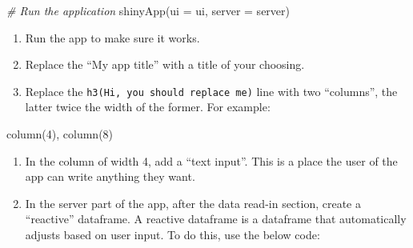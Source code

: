\documentclass[
]{book}
\newenvironment{Shaded}{\begin{snugshade}}{\end{snugshade}}
\newcommand{\AttributeTok}[1]{\textcolor[rgb]{0.77,0.63,0.00}{#1}}
\newcommand{\CommentTok}[1]{\textcolor[rgb]{0.56,0.35,0.01}{\textit{#1}}}
\newcommand{\DecValTok}[1]{\textcolor[rgb]{0.00,0.00,0.81}{#1}}
\newcommand{\FunctionTok}[1]{\textcolor[rgb]{0.00,0.00,0.00}{#1}}
\newcommand{\NormalTok}[1]{#1}
\newcommand{\OtherTok}[1]{\textcolor[rgb]{0.56,0.35,0.01}{#1}}
\newcommand{\SpecialCharTok}[1]{\textcolor[rgb]{0.00,0.00,0.00}{#1}}
\begin{document}
\begin{Shaded}
\begin{Highlighting}[]
\CommentTok{\# Run the application }
\FunctionTok{shinyApp}\NormalTok{(}\AttributeTok{ui =}\NormalTok{ ui, }\AttributeTok{server =}\NormalTok{ server)}
\end{Highlighting}
\end{Shaded}

\begin{enumerate}
\def\labelenumi{\arabic{enumi}.}
\setcounter{enumi}{4}
\item
  Run the app to make sure it works.
\item
  Replace the ``My app title'' with a title of your choosing.
\item
  Replace the \texttt{h3(\textquotesingle{}Hi,\ you\ should\ replace\ me\textquotesingle{})} line with two ``columns'', the latter twice the width of the former. For example:
\end{enumerate}

\begin{Shaded}
\begin{Highlighting}[]
\FunctionTok{column}\NormalTok{(}\DecValTok{4}\NormalTok{),}
\FunctionTok{column}\NormalTok{(}\DecValTok{8}\NormalTok{)}
\end{Highlighting}
\end{Shaded}

\begin{enumerate}
\def\labelenumi{\arabic{enumi}.}
\setcounter{enumi}{7}
\item
  In the column of width 4, add a ``text input''. This is a place the user of the app can write anything they want.
\item
  In the server part of the app, after the data read-in section, create a ``reactive'' dataframe. A reactive dataframe is a dataframe that automatically adjusts based on user input. To do this, use the below code:
\end{enumerate}

\begin{Shaded}
\end{Shaded}
\end{document}
